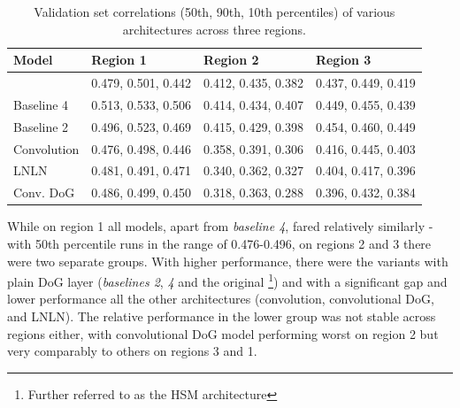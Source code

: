 \setlength{\abovecaptionskip}{10pt plus 0pt minus 0pt} %
\begin{table}[H]
    \renewcommand{\arraystretch}{1.0}
    \centering
    \begin{tabular}{l|l|l|l}
        \toprule
        \textbf{Model} & \textbf{Region 1} & \textbf{Region 2} & \textbf{Region 3} \\ \midrule
        \citeauthor{antolik} & 0.479, 0.501, 0.442 & 0.412, 0.435, 0.382 & 0.437, 0.449, 0.419 \\ 
        Baseline 4 & 0.513, 0.533, 0.506 & 0.414, 0.434, 0.407 & 0.449, 0.455, 0.439 \\ 
        Baseline 2 & 0.496, 0.523, 0.469 & 0.415, 0.429, 0.398 & 0.454, 0.460, 0.449 \\ 
        Convolution & 0.476, 0.498, 0.446 & 0.358, 0.391, 0.306 & 0.416, 0.445, 0.403 \\ 
        LNLN & 0.481, 0.491, 0.471 & 0.340, 0.362, 0.327 & 0.404, 0.417, 0.396 \\ 
        Conv. DoG & 0.486, 0.499, 0.450 & 0.318, 0.363, 0.288 & 0.396, 0.432, 0.384 \\ \bottomrule
    \end{tabular}
    \caption[Performance of various models across regions]{Validation set correlations (50th, 90th, 10th percentiles) of various architectures across three regions.}
    \label{tab:5.3.2.1}
    \renewcommand{\arraystretch}{1.0}
\end{table}
\setlength{\abovecaptionskip}{0pt plus 0pt minus 0pt} %

While on region 1 all models, apart from \textit{baseline 4}, fared relatively similarly - with 50th percentile runs in the range of 0.476-0.496, on regions 2 and 3 there were two separate groups. With higher performance, there were the variants with plain DoG layer (\textit{baselines 2}, \textit{4} and the original \cite{antolik}\footnote{Further referred to as the HSM architecture}) and with a significant gap and lower performance all the other architectures (convolution, convolutional DoG, and LNLN). The relative performance in the lower group was not stable across regions either, with convolutional DoG model performing worst on region 2 but very comparably to others on regions 3 and 1. 

